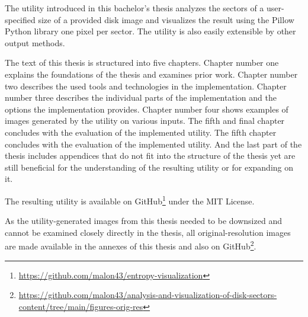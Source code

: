 \documentclass[
  digital, %
  color,   %
  oneside, %
  lof,     %
  nolot,     %
]{fithesis4}
\begin{document}
The utility introduced in this bachelor's thesis analyzes the sectors of a user-specified size of a provided disk image and visualizes the result using the Pillow Python library\cite{pillow} one pixel per sector.
The utility is also easily extensible by other output methods.

The text of this thesis is structured into five chapters.
Chapter number one explains the foundations of the thesis and examines prior work.
Chapter number two describes the used tools and technologies in the implementation.
Chapter number three describes the individual parts of the implementation and the options the implementation provides.
Chapter number four shows examples of images generated by the utility on various inputs.
The fifth and final chapter concludes with the evaluation of the implemented utility.
The fifth chapter concludes with the evaluation of the implemented utility.
And the last part of the thesis includes appendices that do not fit into the structure of the thesis yet are still beneficial for the understanding of the resulting utility or for expanding on it.

The resulting utility is available on GitHub\footnote{\url{https://github.com/malon43/entropy-visualization}} under the MIT License.

As the utility-generated images from this thesis needed to be downsized and cannot be examined closely directly in the thesis, all original-resolution images are made available in the annexes of this thesis and also on GitHub\footnote{\url{https://github.com/malon43/analysis-and-visualization-of-disk-sectors-content/tree/main/figures-orig-res}}.




\end{document}
